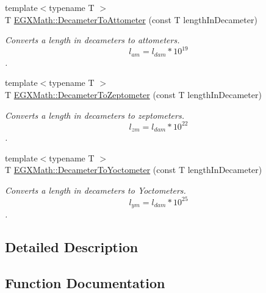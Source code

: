 \begin{DoxyCompactItemize}
{\footnotesize template$<$typename T $>$ }\\T \mbox{\hyperlink{group___e_g_x_math-_conversions-_length_conversions-_decameter-_s_i_ga580471565f6ffb83166a8b21b2a3a01e}{E\+G\+X\+Math\+::\+Decameter\+To\+Attometer}} (const T length\+In\+Decameter)
\begin{DoxyCompactList}\small\item\em Converts a length in decameters to attometers. \[ l_{am}=l_{dam} * 10^{19} \]. \end{DoxyCompactList}\item 
{\footnotesize template$<$typename T $>$ }\\T \mbox{\hyperlink{group___e_g_x_math-_conversions-_length_conversions-_decameter-_s_i_gaa5ec7101e385d972cd3175fab39fd2c6}{E\+G\+X\+Math\+::\+Decameter\+To\+Zeptometer}} (const T length\+In\+Decameter)
\begin{DoxyCompactList}\small\item\em Converts a length in decameters to zeptometers. \[ l_{zm}=l_{dam} * 10^{22} \]. \end{DoxyCompactList}\item 
{\footnotesize template$<$typename T $>$ }\\T \mbox{\hyperlink{group___e_g_x_math-_conversions-_length_conversions-_decameter-_s_i_ga1e90c34b56ee230eec4a3e00a3fedbde}{E\+G\+X\+Math\+::\+Decameter\+To\+Yoctometer}} (const T length\+In\+Decameter)
\begin{DoxyCompactList}\small\item\em Converts a length in decameters to Yoctometers. \[ l_{ym}=l_{dam} * 10^{25} \]. \end{DoxyCompactList}\end{DoxyCompactItemize}


\subsection{Detailed Description}


\subsection{Function Documentation}
\mbox{\label{group___e_g_x_math-_conversions-_length_conversions-_decameter-_s_i_ga580471565f6ffb83166a8b21b2a3a01e}} 
